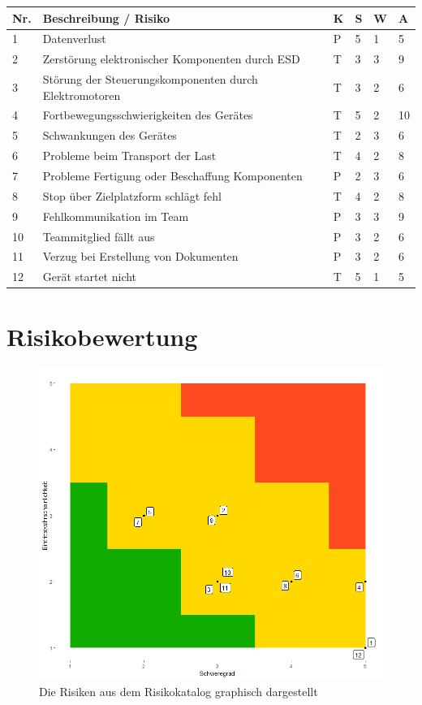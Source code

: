 \documentclass[a4paper]{report}
\begin{document}
\vspace{1em}
\noindent
\begin{tabular}{|p{}|p{}|p{}|p{}|p{}||p{}|}
	\hline
	\textbf{Nr.} & \textbf{Beschreibung / Risiko} & \textbf{K} & \textbf{S} & \textbf{W} & \textbf{A} \\
	\hline
	1 & Datenverlust & P & 5 & 1 & 5\\
	\hline
	2 & Zerstörung elektronischer Komponenten durch ESD & T & 3 & 3 & 9 \\
	\hline
	3 & Störung der Steuerungskomponenten durch Elektromotoren & T & 3 & 2 & 6 \\
	\hline
	4 & Fortbewegungsschwierigkeiten des Gerätes & T & 5 & 2 & 10 \\
	\hline
	5 & Schwankungen des Gerätes & T & 2 & 3 & 6 \\
	\hline
	6 & Probleme beim Transport der Last & T & 4 & 2 & 8 \\
	\hline
	7 & Probleme Fertigung oder Beschaffung Komponenten & P & 2 & 3 & 6 \\
	\hline
	8 & Stop über Zielplatzform schlägt fehl & T & 4 & 2 & 8 \\
	\hline
	9 & Fehlkommunikation im Team & P & 3 & 3 & 9 \\
	\hline
	10 & Teammitglied fällt aus & P & 3 & 2 & 6 \\
	\hline
	11 & Verzug bei Erstellung von Dokumenten & P & 3 & 2 & 6 \\
	\hline
	12 & Gerät startet nicht & T & 5 & 1 & 5 \\
	\hline
\end{tabular}

\section{Risikobewertung}

\begin{figure}[h!]
	\centering
	\includegraphics[width=.6\textwidth,keepaspectratio]{Risikomatrix}
	\caption{Die Risiken aus dem Risikokatalog graphisch dargestellt}
	\label{fig:Risikomatrix}
\end{figure}
\end{document}
